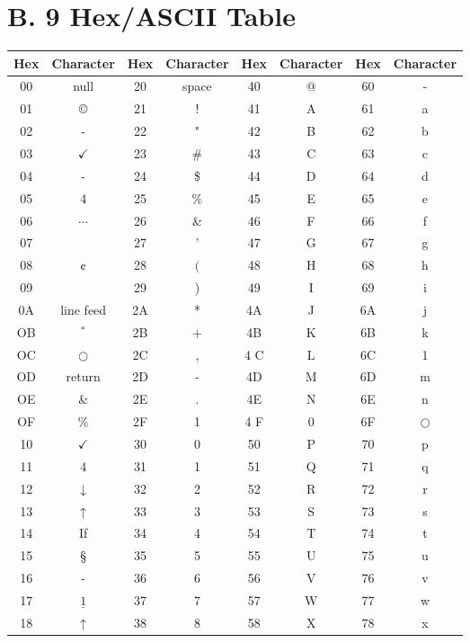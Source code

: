 \documentclass[10pt]{book}
\begin{document}
\section*{B. 9 Hex/ASCII Table}
\begin{center}
\begin{tabular}{|c|c|c|c|c|c|c|c|}
\hline
Hex & Character & Hex & Character & Hex & Character & Hex & Character \\
\hline
00 & null & 20 & space & 40 & @ & 60 & - \\
\hline
01 & © & 21 & ! & 41 & A & 61 & a \\
\hline
02 & - & 22 & " & 42 & B & 62 & b \\
\hline
03 & $\checkmark$ & 23 & \# & 43 & C & 63 & c \\
\hline
04 & - & 24 & \$ & 44 & D & 64 & d \\
\hline
05 & 4 & 25 & \% & 45 & E & 65 & e \\
\hline
06 & $\cdots$ & 26 & \& & 46 & F & 66 & f \\
\hline
07 &  & 27 & ' & 47 & G & 67 & g \\
\hline
08 & ¢ & 28 & $($ & 48 & H & 68 & h \\
\hline
09 &  & 29 & ) & 49 & I & 69 & i \\
\hline
0A & line feed & 2A & * & 4A & J & 6A & j \\
\hline
OB & ${ }^{*}$ & 2B & + & 4B & K & 6B & k \\
\hline
OC & $\bigcirc$ & 2C & , & 4 C & L & 6C & 1 \\
\hline
OD & return & 2D & - & 4D & M & 6D & m \\
\hline
OE & \& & 2E & . & 4E & N & 6E & n \\
\hline
OF & \% & 2F & 1 & 4 F & 0 & 6F & $\bigcirc$ \\
\hline
10 & $\checkmark$ & 30 & 0 & 50 & P & 70 & p \\
\hline
11 & 4 & 31 & 1 & 51 & Q & 71 & q \\
\hline
12 & $\downarrow$ & 32 & 2 & 52 & R & 72 & r \\
\hline
13 & $\uparrow$ & 33 & 3 & 53 & S & 73 & s \\
\hline
14 & If & 34 & 4 & 54 & T & 74 & t \\
\hline
15 & § & 35 & 5 & 55 & U & 75 & u \\
\hline
16 & - & 36 & 6 & 56 & V & 76 & v \\
\hline
17 & $\underline{1}$ & 37 & 7 & 57 & W & 77 & w \\
\hline
18 & $\uparrow$ & 38 & 8 & 58 & X & 78 & x \\

\end{tabular}
\end{center}
\end{document}
